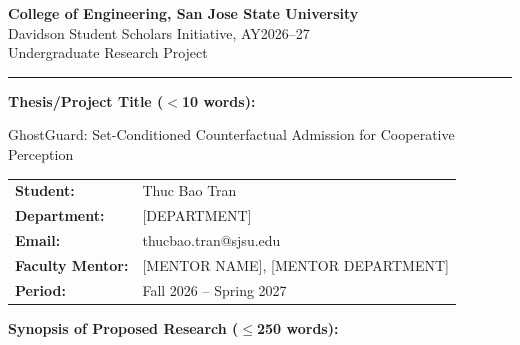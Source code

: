 \documentclass[11pt]{article}
\newcommand{\heading}[1]{\vspace{2pt}\textbf{#1}\vspace{2pt}}
\begin{document}
\begin{center}
  {\large\bfseries College of Engineering, San Jose State University}\\[2pt]
  {Davidson Student Scholars Initiative, AY2026--27}\\[2pt]
  {Undergraduate Research Project}
\end{center}

\vspace{6pt}
\hrule
\vspace{12pt}

\heading{Thesis/Project Title ($<$10 words):}

{\large GhostGuard: Set-Conditioned Counterfactual Admission for Cooperative
Perception}

\vspace{10pt}

\begin{tabular}{@{}ll@{}}
  \textbf{Student:}        & Thuc Bao Tran \\
  \textbf{Department:}     & [DEPARTMENT] \\
  \textbf{Email:}          & thucbao.tran@sjsu.edu \\
  \textbf{Faculty Mentor:} & [MENTOR NAME], [MENTOR DEPARTMENT] \\
  \textbf{Period:}         & Fall 2026 -- Spring 2027 \\
\end{tabular}

\vspace{14pt}

\heading{Synopsis of Proposed Research ($\leq$250 words):}
\end{document}
